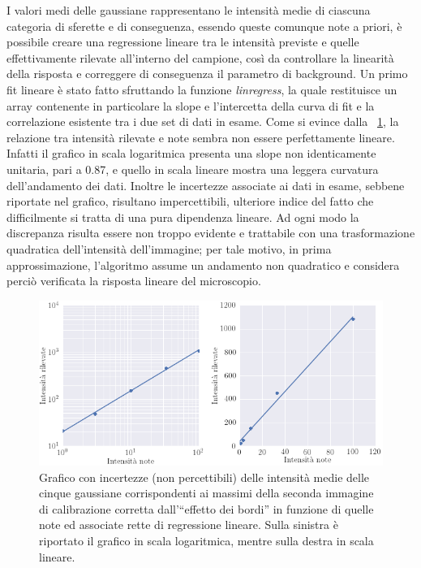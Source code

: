 I valori medi delle gaussiane rappresentano le intensità medie di ciascuna categoria di sferette e di conseguenza, essendo queste comunque note a priori, è possibile creare una regressione lineare tra le intensità previste e quelle effettivamente rilevate all'interno del campione, così da controllare la linearità della risposta e correggere di conseguenza il parametro di background. 
Un primo fit lineare è stato fatto sfruttando la funzione \textit{linregress}, la quale restituisce un array contenente in particolare la slope e l'intercetta della curva di fit e la correlazione esistente tra i due set di dati in esame.
Come si evince dalla \figurename~\ref{fig:linearita}, la relazione tra intensità rilevate e note sembra non essere perfettamente lineare. Infatti il grafico in scala logaritmica presenta una slope non identicamente unitaria, pari a 0.87, e quello in scala lineare mostra una leggera curvatura dell'andamento dei dati. 
Inoltre le incertezze associate ai dati in esame, sebbene riportate nel grafico, risultano impercettibili, ulteriore indice del fatto che difficilmente si tratta di una pura dipendenza lineare. 
Ad ogni modo la discrepanza risulta essere non troppo evidente e trattabile con una trasformazione quadratica dell'intensità dell'immagine; per tale motivo, in prima approssimazione, l'algoritmo assume un andamento non quadratico e considera perciò verificata la risposta lineare del microscopio. 

\begin{figure}
 \centering
 \includegraphics[scale=.55]{img/CAP3linearita.png}
 \caption{\small{Grafico con incertezze (non percettibili) delle intensità medie delle cinque gaussiane corrispondenti ai massimi della seconda immagine di calibrazione corretta dall'``effetto dei bordi'' in funzione di quelle note ed associate rette di regressione lineare. Sulla sinistra è riportato il grafico in scala logaritmica, mentre sulla destra in scala lineare.}}
 \label{fig:linearita}
\end{figure}


